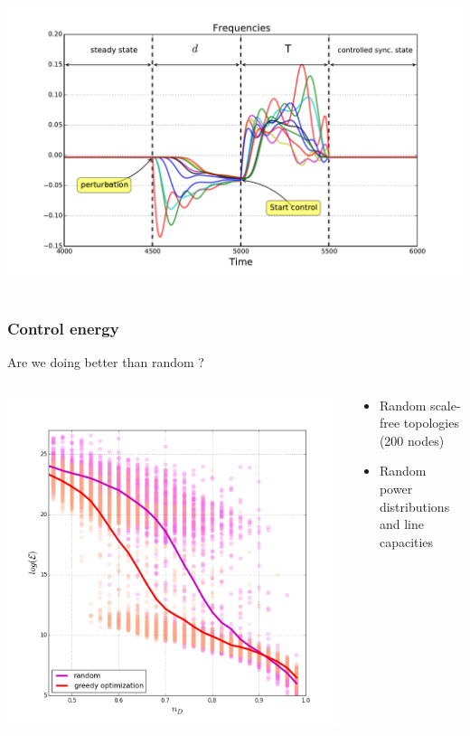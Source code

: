\documentclass[xcolor=dvipsnames]{beamer}
\begin{document}
\begin{frame}
\begin{columns}
\begin{column}{.5\textwidth}
			\includegraphics[scale=.27]{figure_2}
		\end{column}
	\end{columns}
\end{frame}

\begin{frame}
	\frametitle{Control energy}
	
	Are we doing better than random ?
	\begin{columns}
		\begin{column}{.6\textwidth}		
			\includegraphics[scale=.3]{figure_3.png}
		\end{column}
		\begin{column}{.4\textwidth}
			\begin{itemize}
				\item Random scale-free topologies (200 nodes)
				\item Random power distributions and line capacities
			\end{itemize}
		\end{column}
	\end{columns}
	
\end{frame}
\end{document}
